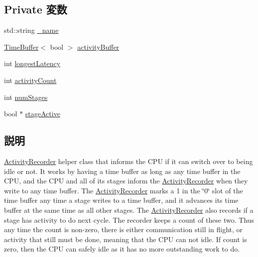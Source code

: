 \subsection*{Private 変数}
\begin{DoxyCompactItemize}
\item 
std::string \hyperlink{classActivityRecorder_aaf2ed934b37cbbd236fdd1b01a5f5005}{\_\-name}
\item 
\hyperlink{classTimeBuffer}{TimeBuffer}$<$ bool $>$ \hyperlink{classActivityRecorder_a6c508a89a541285053c7b900bd730cc2}{activityBuffer}
\item 
int \hyperlink{classActivityRecorder_a20bd7fb0de8433f0f95dc50ed74bf620}{longestLatency}
\item 
int \hyperlink{classActivityRecorder_adf01a2f1e7e8ad0795ef04b3a4e6dfb6}{activityCount}
\item 
int \hyperlink{classActivityRecorder_aaf4f71ec3fd6f4e154d09cd71c2c331b}{numStages}
\item 
bool $\ast$ \hyperlink{classActivityRecorder_aebf0081a358874c1eedf8728e4a478a4}{stageActive}
\end{DoxyCompactItemize}


\subsection{説明}
\hyperlink{classActivityRecorder}{ActivityRecorder} helper class that informs the CPU if it can switch over to being idle or not. It works by having a time buffer as long as any time buffer in the CPU, and the CPU and all of its stages inform the \hyperlink{classActivityRecorder}{ActivityRecorder} when they write to any time buffer. The \hyperlink{classActivityRecorder}{ActivityRecorder} marks a 1 in the \char`\"{}0\char`\"{} slot of the time buffer any time a stage writes to a time buffer, and it advances its time buffer at the same time as all other stages. The \hyperlink{classActivityRecorder}{ActivityRecorder} also records if a stage has activity to do next cycle. The recorder keeps a count of these two. Thus any time the count is non-\/zero, there is either communication still in flight, or activity that still must be done, meaning that the CPU can not idle. If count is zero, then the CPU can safely idle as it has no more outstanding work to do. 

